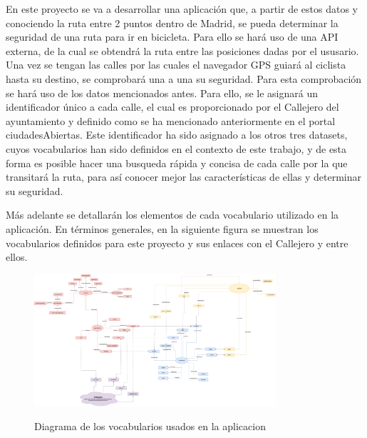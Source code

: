 En este proyecto se va a desarrollar una aplicación que, a partir de estos datos y conociendo la ruta entre 2 puntos dentro de Madrid, se pueda determinar la seguridad de una ruta para ir en bicicleta. Para ello se hará uso de una API externa, de la cual se obtendrá la ruta entre las posiciones dadas por el ususario. Una vez se tengan las calles por las cuales el navegador GPS guiará al ciclista hasta su destino, se comprobará una a una su seguridad.
Para esta comprobación se hará uso de los datos mencionados antes. Para ello, se le asignará un identificador único a cada calle, el cual es proporcionado por el Callejero del ayuntamiento \cite{datosmadrid_callejero} y definido como se ha mencionado anteriormente en el portal ciudadesAbiertas. Este identificador ha sido asignado a los otros tres datasets, cuyos vocabularios han sido definidos en el contexto de este trabajo, y de esta forma es posible hacer una busqueda rápida y concisa de cada calle por la que transitará la ruta, para así conocer mejor las características de ellas y determinar su seguridad.
\newline
\newline

Más adelante se detallarán los elementos de cada vocabulario utilizado en la aplicación. En términos generales, en la siguiente figura se muestran los vocabularios definidos para este proyecto y sus enlaces con el Callejero y entre ellos.



\begin{figure}[h]
  \centering
  \includegraphics[angle=90, width=0.8\textwidth]{images/diagramaAppTotal.png} 
  \\
  \caption{Diagrama de los vocabularios usados en la aplicacion}
  \label{fig:esquemaTotalVocab}
\end{figure}

